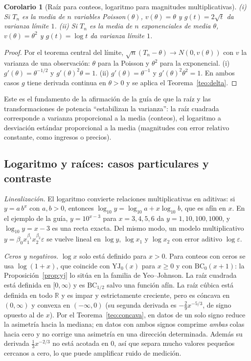 \documentclass[11pt]{article}
\newtheorem{corolario}[teorema]{Corolario}
\theoremstyle{definition}
\theoremstyle{remark}
\newcommand{\R}{\mathbb{R}}
\newcommand{\BC}{\mathrm{BC}}
\newcommand{\YJ}{\mathrm{YJ}}
\begin{document}
\begin{corolario}[Raíz para conteos, logaritmo para magnitudes multiplicativas]\label{cor:estab}
\noindent (i) Si $T_n$ es la media de $n$ variables Poisson$(\theta)$, $v(\theta)=\theta$ y $g(t)=2\sqrt t$ da varianza límite $1$. (ii) Si $T_n$ es la media de $n$ exponenciales de media $\theta$, $v(\theta)=\theta^2$ y $g(t)=\log t$ da varianza límite $1$.
\end{corolario}
\begin{proof}
\noindent Por el teorema central del límite, $\sqrt n(T_n-\theta)\to N(0,v(\theta))$ con $v$ la varianza de una observación: $\theta$ para la Poisson y $\theta^2$ para la exponencial. (i) $g'(\theta)=\theta^{-1/2}$ y $g'(\theta)^2\theta=1$. (ii) $g'(\theta)=\theta^{-1}$ y $g'(\theta)^2\theta^2=1$. En ambos casos $g$ tiene derivada continua en $\theta>0$ y se aplica el Teorema~\ref{teo:delta}.
\end{proof}

\noindent Este es el fundamento de la afirmación de la guía de que la raíz y las transformaciones de potencia ``estabilizan la varianza'': la raíz cuadrada corresponde a varianza proporcional a la media (conteos), el logaritmo a desviación estándar proporcional a la media (magnitudes con error relativo constante, como ingresos o precios).

\subsection{Logaritmo y raíces: casos particulares y contraste}\label{sec:log-raices}

\noindent \emph{Linealización.} El logaritmo convierte relaciones multiplicativas en aditivas: si $y=a\,b^{x}$ con $a,b>0$, entonces $\log_{10}y=\log_{10}a+x\log_{10}b$, que es afín en $x$. En el ejemplo de la guía, $y=10^{x-3}$ para $x=3,4,5,6$ da $y=1,10,100,1000$, y $\log_{10}y=x-3$ es una recta exacta. Del mismo modo, un modelo multiplicativo $y=\beta_0x_1^{\beta_1}x_2^{\beta_2}\varepsilon$ se vuelve lineal en $\log y$, $\log x_1$ y $\log x_2$ con error aditivo $\log\varepsilon$.

\medskip

\noindent \emph{Ceros y negativos.} $\log x$ solo está definido para $x>0$. Para conteos con ceros se usa $\log(1+x)$, que coincide con $\YJ_0(x)$ para $x\ge0$ y con $\BC_0(x+1)$: la Proposición~\ref{prop:yj} lo sitúa en la familia de Yeo--Johnson. La raíz cuadrada está definida en $[0,\infty)$ y es $\BC_{1/2}$ salvo una función afín. La raíz cúbica está definida en todo $\R$ y es impar y estrictamente creciente, pero es cóncava en $(0,\infty)$ y convexa en $(-\infty,0)$ (su segunda derivada es $-\frac29x^{-5/3}$, de signo opuesto al de $x$). Por el Teorema~\ref{teo:concava}, en datos de un solo signo reduce la asimetría hacia la mediana; en datos con ambos signos comprime \emph{ambas} colas hacia cero y no corrige una asimetría en una dirección determinada. Además su derivada $\frac13x^{-2/3}$ no está acotada en $0$, así que separa mucho valores pequeños cercanos a cero, lo que puede amplificar ruido de medición.
\end{document}
